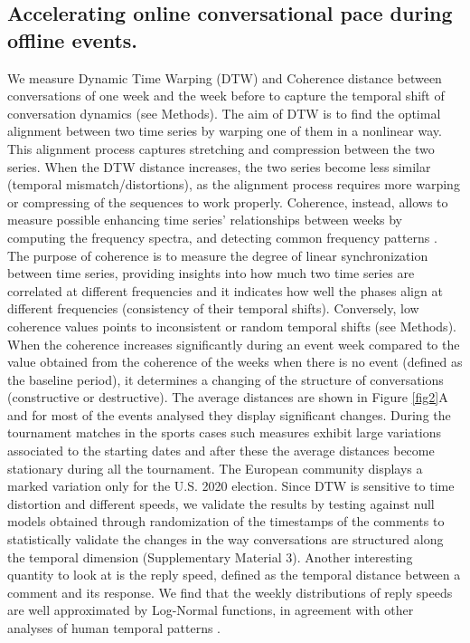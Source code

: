 \documentclass[fleqn,10pt]{wlscirep}
\begin{document}
\subsection*{Accelerating online conversational pace during offline events.}
We measure Dynamic Time Warping (DTW) and Coherence distance between conversations of one week and the week before to capture the temporal shift of conversation dynamics (see Methods). 
The aim of DTW \cite{berndt1994using} is to find the optimal alignment between two time series by warping one of them in a nonlinear way. This alignment process captures stretching and compression between the two series. 
When the DTW distance increases, the two series become less similar (temporal mismatch/distortions), as the alignment process requires more warping or compressing of the sequences to work properly.
Coherence, instead, allows to measure possible enhancing time series' relationships between weeks by computing the frequency spectra, and detecting common frequency patterns \cite{grinsted2004application,maharaj2010coherence}. 
The purpose of coherence is to measure the degree of linear synchronization between time series, providing insights into how much two time series are correlated at different frequencies and it indicates how well the phases align at different frequencies (consistency of their temporal shifts).
Conversely, low coherence values points to inconsistent or random temporal shifts (see Methods).
When the coherence increases significantly during an event week compared to the value obtained from the coherence of the weeks when there is no event (defined as the baseline period), it determines a changing of the structure of conversations (constructive or destructive).
%
The average distances are shown in Figure \ref{fig2}A and for most of the events analysed they display significant changes.
During the tournament matches in the sports cases such measures exhibit large variations associated to the starting dates and after these the average distances become stationary during all the tournament. The European community displays a marked variation only for the U.S.  2020 election.
%
Since DTW is sensitive to time distortion and different speeds, we validate the results by testing against null models obtained through randomization of the timestamps of the comments to statistically validate the changes in the way conversations are structured along the temporal dimension (Supplementary Material 3).
%
Another interesting quantity to look at is the reply speed, defined as the temporal distance between a comment and its response. We find that the weekly distributions of reply speeds are well approximated by Log-Normal functions, in agreement with other analyses of human temporal patterns \cite{kaltenbrunner2007homogeneous}.
\end{document}
